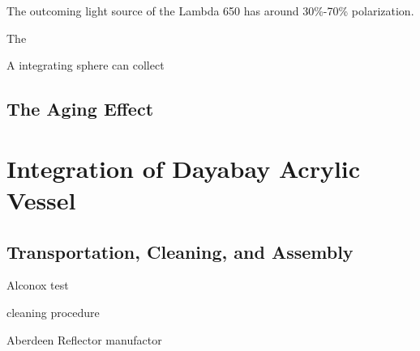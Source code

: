 The outcoming light source of the Lambda 650 has around 30\%-70\% polarization.

The

A integrating sphere can collect


\subsection {The Aging Effect}


\section {Integration of Dayabay Acrylic Vessel}

\subsection {Transportation, Cleaning, and Assembly}

Alconox test

cleaning procedure

Aberdeen Reflector manufactor
